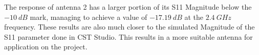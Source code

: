 \par The response of antenna 2 has a larger portion of its S11 Magnitude below the $-10\:\si{dB}$ mark, managing to achieve a value of $-17.19\:\si{dB}$ at the $2.4\:\si{GHz}$ frequency. These results are also much closer to the simulated Magnitude of the S11 parameter done in CST Studio. This results in a more suitable antenna for application on the project.
